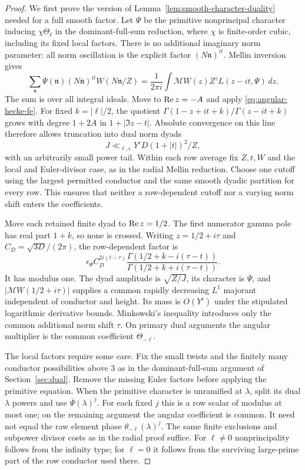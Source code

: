 \begin{proof}
We first prove the version of Lemma~\ref{lem:smooth-character-duality}
needed for a full smooth factor. Let $\Psi$ be the primitive
nonprincipal character inducing $\chi\Theta_\ell$ in the
dominant-full-sum reduction, where $\chi$ is finite-order cubic,
including its fixed local factors. There is no additional imaginary
norm parameter: all norm oscillation is the explicit factor
$(N\mathfrak n)^{it}$. Mellin inversion gives
\[
 \sum_{\mathfrak n}\Psi(\mathfrak n)(N\mathfrak n)^{it}
       W(N\mathfrak n/Z)
 =\frac1{2\pi i}\int \mathcal MW(z)Z^zL(z-it,\Psi)\,dz.
\]
The sum is over all integral ideals. Move to $\operatorname{Re} z=-A$ and
apply \eqref{eq:angular-hecke-fe}. For fixed $k=|\ell|/2$,
the quotient $\Gamma(1-z+it+k)/\Gamma(z-it+k)$ grows with
degree $1+2A$ in $1+|\Im z-t|$. Absolute convergence on this
line therefore allows truncation into dual norm dyads
\begin{equation}\label{eq:angular-smooth-cutoff}
 J\ll_{\ell,\epsilon}Y^\epsilon D(1+|t|)^2/Z,
\end{equation}
with an arbitrarily small power tail. Within each row average fix
$Z,t,W$ and the local and Euler-divisor case, as in the radial
Mellin reduction. Choose one cutoff using the largest permitted
conductor and the same smooth dyadic partition for every row.
This ensures that neither a row-dependent cutoff nor a varying
norm shift enters the coefficients.

Move each retained finite dyad to $\operatorname{Re} z=1/2$. The first
numerator gamma pole has real part $1+k$, so none is crossed.
Writing $z=1/2+i\tau$ and $C_D=\sqrt{3D}/(2\pi)$, the
row-dependent factor is
\[
 \epsilon_\Psi C_D^{2i(t-\tau)}
 \frac{\Gamma(1/2+k-i(\tau-t))}
      {\Gamma(1/2+k+i(\tau-t))}.
\]
It has modulus one. The dyad amplitude is $\sqrt{Z/J}$, its
character is $\overline\Psi$, and
$|\mathcal MW(1/2+i\tau)|$ supplies a common rapidly decreasing
$L^1$ majorant independent of conductor and height. Its mass is
$O(Y^\epsilon)$ under the stipulated logarithmic derivative
bounds. Minkowski's inequality introduces only the common
additional norm shift $\tau$. On primary dual arguments the
angular multiplier is the common coefficient $\Theta_{-\ell}$.

The local factors require some care. Fix the small twists and
the finitely many conductor possibilities above $3$ as in the
dominant-full-sum argument of Section~\ref{sec:dual}. Remove
the missing Euler factors before applying the primitive equation.
When the primitive character is unramified at $\lambda$, split
its dual $\lambda$ powers and use $\overline\Psi(\lambda)^j$.
For each fixed $j$ this is a row scalar of modulus at most one;
on the remaining argument the angular coefficient is common.
It need not equal the raw element phase
$\theta_{-\ell}(\lambda)^j$. The same finite exclusions and
subpower divisor costs as in the radial proof suffice. For
$\ell\ne0$ nonprincipality follows from the infinity type; for
$\ell=0$ it follows from the surviving large-prime part of the
row conductor used there.


\end{proof}
